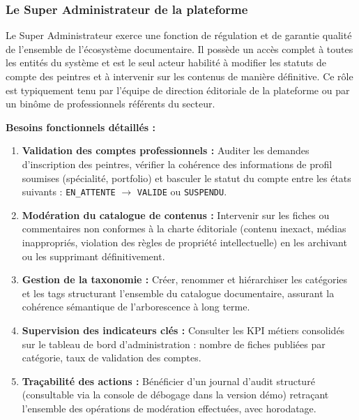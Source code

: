 \documentclass[12pt,a4paper]{report}
\begin{document}
\subsubsection*{Le Super Administrateur de la plateforme}

\noindent
Le Super Administrateur exerce une fonction de régulation et de garantie qualité de l'ensemble de l'écosystème documentaire. Il possède un accès complet à toutes les entités du système et est le seul acteur habilité à modifier les statuts de compte des peintres et à intervenir sur les contenus de manière définitive. Ce rôle est typiquement tenu par l'équipe de direction éditoriale de la plateforme ou par un binôme de professionnels référents du secteur.

\vspace{0.5em}
\textbf{Besoins fonctionnels détaillés :}

\begin{enumerate}[leftmargin=1.5cm, label=\textbf{BF-\arabic*.}, itemsep=5pt]
    \item \textbf{Validation des comptes professionnels :} Auditer les demandes d'inscription des peintres, vérifier la cohérence des informations de profil soumises (spécialité, portfolio) et basculer le statut du compte entre les états suivants : \texttt{EN\_ATTENTE} $\rightarrow$ \texttt{VALIDE} ou \texttt{SUSPENDU}.
    \item \textbf{Modération du catalogue de contenus :} Intervenir sur les fiches ou commentaires non conformes à la charte éditoriale (contenu inexact, médias inappropriés, violation des règles de propriété intellectuelle) en les archivant ou les supprimant définitivement.
    \item \textbf{Gestion de la taxonomie :} Créer, renommer et hiérarchiser les catégories et les tags structurant l'ensemble du catalogue documentaire, assurant la cohérence sémantique de l'arborescence à long terme.
    \item \textbf{Supervision des indicateurs clés :} Consulter les KPI métiers consolidés sur le tableau de bord d'administration : nombre de fiches publiées par catégorie, taux de validation des comptes.
    \item \textbf{Traçabilité des actions :} Bénéficier d'un journal d'audit structuré (consultable via la console de débogage dans la version démo) retraçant l'ensemble des opérations de modération effectuées, avec horodatage.
\end{enumerate}
\end{document}
